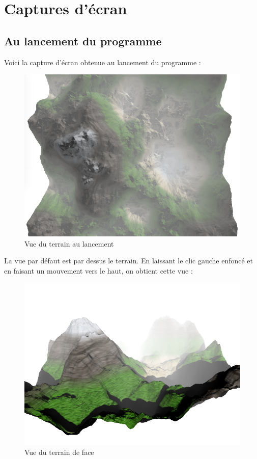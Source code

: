 \documentclass{article}
\begin{document}
\section{Captures d'écran}

\subsection{Au lancement du programme}
Voici la capture d'écran obtenue au lancement du programme :
\begin{figure}[h]
	\center
	\includegraphics[scale=0.30]{screen0.png}
	\caption{Vue du terrain au lancement}
\end{figure}

La vue par défaut est par dessus le terrain.
\newpage
En laissant le clic gauche enfoncé et en faisant un mouvement vers le haut, on obtient cette vue :

\begin{figure}[h]
	\center
	\includegraphics[scale=0.30]{screen1.png}
	\caption{Vue du terrain de face}
\end{figure}
\end{document}
